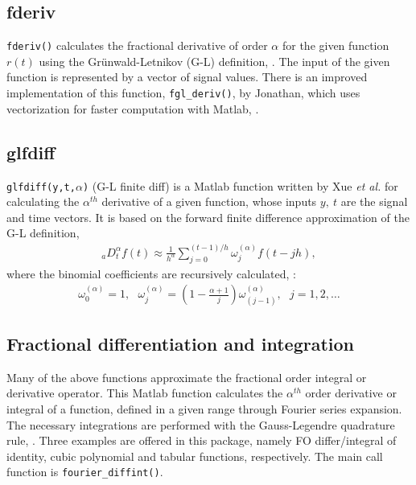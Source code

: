 \documentclass[11pt]{tCON2e}
\theoremstyle{plain}\newtheorem{theorem}{Theorem}
\theoremstyle{definition}
\theoremstyle{remark}
\begin{document}
\subsection{fderiv}
{\tt fderiv()} calculates the fractional derivative of order $\alpha$ for the given function $r(t)$ using the Gr\"{u}nwald-Letnikov (G-L) definition, \cite{ref:Fractional_differentiator}. The input of the given function is represented by a vector of signal values.
There is an improved implementation of this function, {\tt fgl\_deriv()}, by Jonathan, which uses vectorization for faster computation with Matlab, \cite{ref:Fractional_derivative}.




\subsection{glfdiff}
{\tt glfdiff(y,t,$\alpha$)} (G-L finite diff) is a Matlab function written by Xue \emph{et al.} \cite{ref:Xuedingyu_book} for calculating the $\alpha^{th}$ derivative of a given function, whose inputs $y,\ t$ are the signal and time vectors. It is based on the forward finite difference approximation of the G-L definition,
\begin{eqnarray}
{_a}D^{\alpha}_t f(t) \approx \frac{1}{h^{\alpha}} \sum_{j=0}^{(t-1)/h} \omega_j^{(\alpha)}f(t-jh),
\end{eqnarray}
where the binomial coefficients are recursively calculated, \cite{ref:Xuedingyu_book}:
\begin{eqnarray}
\omega_0^{(\alpha)} = 1, \ \ \ \omega_j^{(\alpha)} = \left(1- \frac{\alpha+1}{j} \right) \omega_{(j-1)}^{(\alpha)}, \ \ \ j=1,2,\ldots
\end{eqnarray}




\subsection{Fractional differentiation and integration}
Many of the above functions approximate the fractional order integral or derivative operator. This Matlab function calculates the $\alpha^{th}$ order derivative or integral of a function, defined in a given range through Fourier series expansion. The necessary integrations are performed with the Gauss-Legendre quadrature rule, \cite{ref:FO_diff_and_int}. Three examples are offered in this package, namely FO differ/integral of identity, cubic polynomial and tabular functions, respectively. The main call function is {\tt fourier\_diffint()}.
\end{document}
